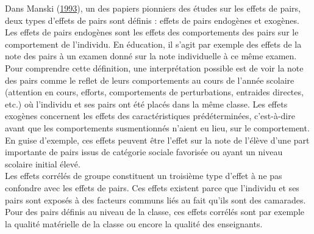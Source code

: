 \documentclass[
]{book}
\begin{document}
\quad Dans Manski (\protect\hyperlink{ref-MAN:93}{1993}), un des papiers pionniers des études sur les effets de pairs, deux types d'effets de pairs sont définis : effets de pairs endogènes et exogènes. Les effets de pairs endogènes sont les effets des comportements des pairs sur le comportement de l'individu. En éducation, il s'agit par exemple des effets de la note des pairs à un examen donné sur la note individuelle à ce même examen. Pour comprendre cette définition, une interprétation possible est de voir la note des pairs comme le reflet de leurs comportements au cours de l'année scolaire (attention en cours, efforts, comportements de perturbations, entraides directes, etc.) où l'individu et ses pairs ont été placés dans la même classe. Les effets exogènes concernent les effets des caractéristiques prédéterminées, c'est-à-dire avant que les comportements susmentionnés n'aient eu lieu, sur le comportement. En guise d'exemple, ces effets peuvent être l'effet sur la note de l'élève d'une part importante de pairs issus de catégorie sociale favorisée ou ayant un niveau scolaire initial élevé.\\
Les effets corrélés de groupe constituent un troisième type d'effet à ne pas confondre avec les effets de pairs. Ces effets existent parce que l'individu et ses pairs sont exposés à des facteurs communs liés au fait qu'ils sont des camarades. Pour des pairs définis au niveau de la classe, ces effets corrélés sont par exemple la qualité matérielle de la classe ou encore la qualité des enseignants.
\end{document}
